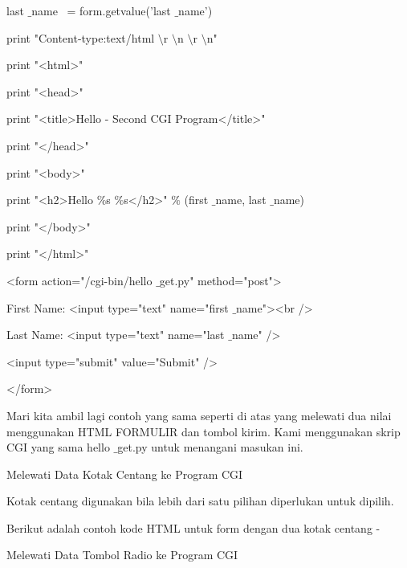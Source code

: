 last $  \_  $name~ = form.getvalue('last $  \_  $name') \par
\vspace{12pt}
\noindent 
print "Content-type:text/html $  \setminus  $r $  \setminus  $n $  \setminus  $r $  \setminus  $n" \par
\noindent 
print "<html>" \par
\noindent 
print "<head>" \par
\noindent 
print "<title>Hello - Second CGI Program</title>" \par
\noindent 
print "</head>" \par
\noindent 
print "<body>" \par
\noindent 
print "<h2>Hello  $  \%  $s  $  \%  $s</h2>"  $  \%  $ (first $  \_  $name, last $  \_  $name) \par
\noindent 
print "</body>" \par
\noindent 
print "</html>" \par
\vspace{12pt}
\noindent 
<form action="/cgi-bin/hello $  \_  $get.py" method="post"> \par
\noindent 
First Name: <input type="text" name="first $  \_  $name"><br /> \par
\noindent 
Last Name: <input type="text" name="last $  \_  $name" /> \par
\vspace{12pt}
\noindent 
<input type="submit" value="Submit" /> \par
\noindent 
</form> \par
\vspace{12pt}
Mari kita ambil lagi contoh yang sama seperti di atas yang melewati dua nilai menggunakan HTML FORMULIR dan tombol kirim. Kami menggunakan skrip CGI yang sama hello $  \_  $get.py untuk menangani masukan ini. \par
\noindent 
Melewati Data Kotak Centang ke Program CGI \par
\vspace{12pt}
\noindent 
Kotak centang digunakan bila lebih dari satu pilihan diperlukan untuk dipilih. \par
\vspace{12pt}
\noindent 
Berikut adalah contoh kode HTML untuk form dengan dua kotak centang - \par
\vspace{12pt}
\noindent 
Melewati Data Tombol Radio ke Program CGI \par
\vspace{12pt}
\noindent 
